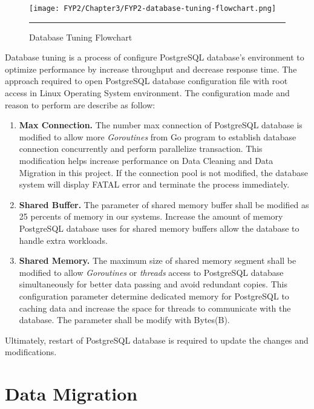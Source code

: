\begin{figure}[H]
	\centering
	\texttt{[image: FYP2/Chapter3/FYP2-database-tuning-flowchart.png]}
	\rule{35em}{0.5pt}
	\caption[Database Tuning Flowchart]{Database Tuning Flowchart}
\end{figure} 

Database tuning is a process of configure PostgreSQL database's environment to optimize performance by increase throughput and decrease response time. The approach required to open PostgreSQL database configuration file with root access in Linux Operating System environment. The configuration made and reason to perform are describe as follow: 

\begin{enumerate}[topsep=0pt,itemsep=-1ex,partopsep=1ex,parsep=1.5ex]
	
	\item \textbf{Max Connection.} The number max connection of PostgreSQL database is modified to allow more \textit{Goroutines} from Go program to establish database connection concurrently and perform parallelize transaction. This modification helps increase performance on Data Cleaning and Data Migration in this project. If the connection pool is not modified, the database system will display FATAL error and terminate the process immediately. 
	\item \textbf{Shared Buffer.} The parameter of shared memory buffer shall be modified as 25 percents of memory in our systems. Increase the amount of memory PostgreSQL database uses for shared memory buffers allow the database to handle extra workloads. 
	\item \textbf{Shared Memory.} The maximum size of shared memory segment shall be modified to allow \textit{Goroutines} or \textit{threads} access to PostgreSQL database simultaneously for better data passing and avoid redundant copies. This configuration parameter determine dedicated memory for PostgreSQL to caching data and increase the space for threads to communicate with the database. The parameter shall be modify with Bytes(B). 
	
\end{enumerate}

Ultimately, restart of PostgreSQL database is required to update the changes and modifications. 

\section{Data Migration} 

